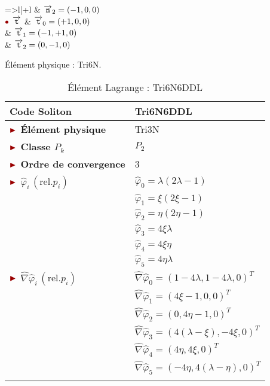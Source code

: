 \begin{table}[H]
\begin{minipage}[t]{0.48\linewidth}
\begin{tabular}{=>{\bfseries}l|+l}
			& $\overrightarrow{\boldsymbol{\mathtt{n}}}_2 = \left(-1, 0, 0\right)$ \\
			\hspace{3mm}$\mybullet$ $\overrightarrow{\boldsymbol{\mathtt{t}}}$ & $\overrightarrow{\boldsymbol{\mathtt{t}}}_0 =\left(+1, 0, 0\right)$\\
			& $\overrightarrow{\boldsymbol{\mathtt{t}}}_1 =\left(-1, +1, 0\right)$\\
			& $\overrightarrow{\boldsymbol{\mathtt{t}}}_2 =\left(0, -1, 0\right)$\\
			\bottomrule %
		\end{tabular}
		\caption{Élément physique : Tri6N.}
		\label{tab:Tri6N}
	\end{minipage}\hfill
	\begin{minipage}[t]{0.48\linewidth}
		\centering
		\begin{tabular}{>{\bfseries} l|l}
			\toprule %
			\rowcolor{black!10}\rowstyle{\color{MyRed}\bfseries} Code Soliton & \textcolor{MyRed}{\textbf{Tri6N6DDL}}\\
			\midrule
			$\mytriangle$ Élément physique & \textcolor{MyRed}{Tri3N}\\
			$\mytriangle$ Classe $P_k$ & $P_2$\\
			$\mytriangle$ Ordre de convergence & 3\\
			\midrule
			$\mytriangle$ $\widehat{\varphi}_i\, (\text{rel.} p_i)$ &  $\widehat{\varphi}_0 = \lambda (2\lambda - 1)$\\
			&  $\widehat{\varphi}_1 = \xi (2\xi -1)$\\
			&  $\widehat{\varphi}_2 = \eta (2\eta - 1)$\\
			&  $\widehat{\varphi}_3 = 4\xi\lambda$\\
			&  $\widehat{\varphi}_4 = 4\xi\eta$\\
			&  $\widehat{\varphi}_5 = 4\eta\lambda$\\
			\midrule
			$\mytriangle$ $\widehat{\nabla}\widehat{\varphi}_i\, (\text{rel.} p_i)$ & $\widehat{\nabla}\widehat{\varphi}_0 = \left(1-4\lambda, 1-4\lambda, 0\right)^T$ \\
			& $\widehat{\nabla}\widehat{\varphi}_1 = \left(4\xi-1, 0, 0\right)^T$ \\
            & $\widehat{\nabla}\widehat{\varphi}_2 = \left(0, 4\eta - 1, 0\right)^T$ \\
            & $\widehat{\nabla}\widehat{\varphi}_3 = \left(4(\lambda - \xi), -4\xi, 0\right)^T$ \\
            & $\widehat{\nabla}\widehat{\varphi}_4 = \left(4\eta, 4\xi, 0\right)^T$ \\
            & $\widehat{\nabla}\widehat{\varphi}_5 = \left(-4\eta, 4(\lambda - \eta), 0\right)^T$ \\
            \midrule
            \multicolumn{2}{l}{$\mytriangle$ $\lambda = 1 - \xi - \eta$}\\
			\bottomrule %
		\end{tabular}
		\caption{Élément Lagrange : Tri6N6DDL}
		\label{tab:Tri6N6DDL}
	\end{minipage}\hfill
\end{table}

